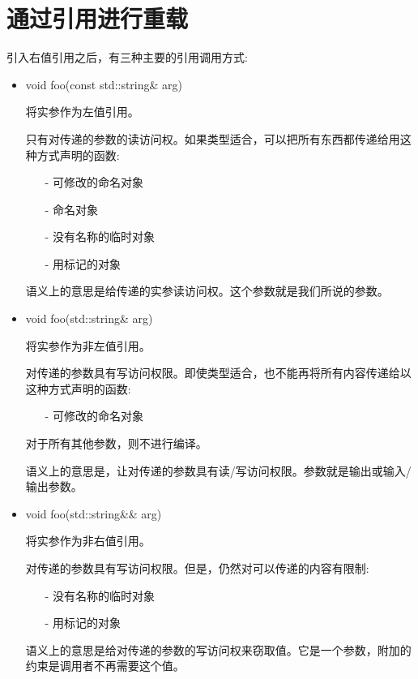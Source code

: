 \section{通过引用进行重载}
引入右值引用之后，有三种主要的引用调用方式:

\begin{itemize}
	\item \begin{cppcode}
void foo(const std::string\& arg)
\end{cppcode}
	将实参作为左值引用。

	只有对传递的参数的读访问权。如果类型适合，可以把所有东西都传递给用这种方式声明的函数:

	\begin{itemize}
		\item[-] 可修改的命名对象
		\item[-] 命名对象
		\item[-] 没有名称的临时对象
		\item[-] 用标记的对象
	\end{itemize}
	语义上的意思是给传递的实参读访问权。这个参数就是我们所说的参数。
	\item \begin{cppcode}
void foo(std::string\& arg)
\end{cppcode}
	将实参作为非左值引用。

	对传递的参数具有写访问权限。即使类型适合，也不能再将所有内容传递给以这种方式声明的函数:

	\begin{itemize}
		\item[-] 可修改的命名对象
	\end{itemize}
	对于所有其他参数，则不进行编译。

	语义上的意思是，让对传递的参数具有读/写访问权限。参数就是输出或输入/输出参数。

	\item \begin{cppcode}
void foo(std::string\&\& arg)
\end{cppcode}
	将实参作为非右值引用。

	对传递的参数具有写访问权限。但是，仍然对可以传递的内容有限制:

	\begin{itemize}
		\item[-] 没有名称的临时对象
		\item[-] 用标记的对象
	\end{itemize}
	语义上的意思是给对传递的参数的写访问权来窃取值。它是一个参数，附加的约束是调用者不再需要这个值。
\end{itemize}

